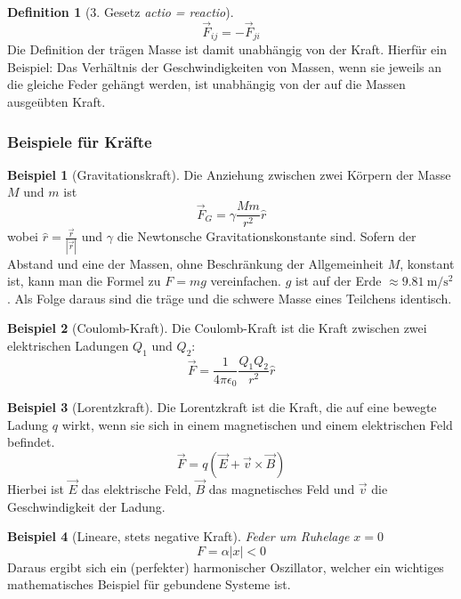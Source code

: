 \documentclass[oneside]{book}
\theoremstyle{definition}
\newtheorem*{definition*}{Definition}
\newtheorem*{beispiel*}{Beispiel}
\begin{document}
\begin{definition*}[3. Gesetz \textit{actio = reactio}]
\begin{equation*}
	\vec{F}_{ij} = -\vec{F}_{ji}
\end{equation*}
Die Definition der trägen Masse ist damit unabhängig von der Kraft. Hierfür ein Beispiel: Das Verhältnis der Geschwindigkeiten von Massen, wenn sie jeweils an die gleiche Feder gehängt werden, ist unabhängig von der auf die Massen ausgeübten Kraft.
\end{definition*}

\subsubsection{Beispiele für Kräfte}

\begin{beispiel*}[Gravitationskraft]
Die Anziehung zwischen zwei Körpern der Masse $M$ und $m$ ist 
$$\vec{F}_G = \gamma \frac{M m}{r^2} \hat{r}$$
 wobei $\hat{r} = \frac{\vec{r}}{|\vec{r}|}$ und $\gamma$ die Newtonsche Gravitationskonstante sind. Sofern der Abstand und eine der Massen, ohne Beschränkung der Allgemeinheit $M$, konstant ist, kann man die Formel zu $F = m g$ vereinfachen. $g$ ist auf der Erde $\approx \SI{9.81}{\meter\per\second\squared}$.
 Als Folge daraus sind die träge und die schwere Masse eines Teilchens identisch.
\end{beispiel*}

\begin{beispiel*}[Coulomb-Kraft]
Die Coulomb-Kraft ist die Kraft zwischen zwei elektrischen Ladungen $Q_1$ und $Q_2$:
\begin{equation*}
	\vec{F} = \frac{1}{4 \pi \epsilon_0} \frac{Q_1 Q_2}{r^2} \hat{r}
\end{equation*}
\end{beispiel*}

\begin{beispiel*}[Lorentzkraft]
Die Lorentzkraft ist die Kraft, die auf eine bewegte Ladung $q$ wirkt, wenn sie sich in einem magnetischen und einem elektrischen Feld befindet. 
\begin{equation*}
	\vec{F} = q (\vec{E} + \vec{v} \times \vec{B})
\end{equation*}
Hierbei ist $\vec{E}$ das elektrische Feld, $\vec{B}$ das magnetisches Feld und $\vec{v}$ die Geschwindigkeit der Ladung.
\end{beispiel*}

\begin{beispiel*}[Lineare, stets negative Kraft]
\textit{Feder um Ruhelage $x = 0$}
$$F = \alpha |x| < 0$$
Daraus ergibt sich ein (perfekter) harmonischer Oszillator, welcher ein wichtiges mathematisches Beispiel für gebundene Systeme ist.
\end{beispiel*}
\end{document}

